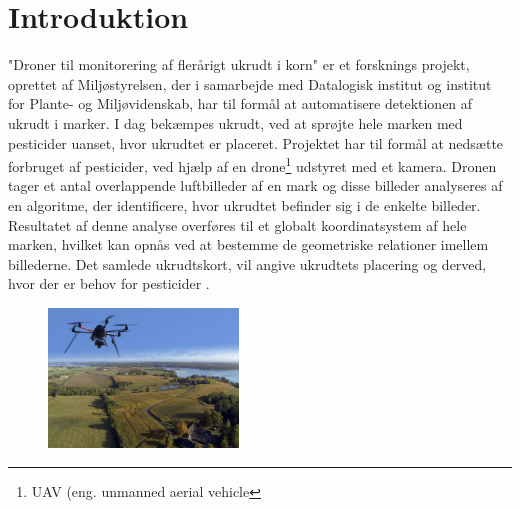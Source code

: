 \chapter{Introduktion} \label{sec:intro}
"Droner til monitorering af flerårigt ukrudt i korn" er et forsknings projekt, oprettet af Miljøstyrelsen, der i samarbejde med Datalogisk institut og institut for Plante- og Miljøvidenskab, har til formål at automatisere detektionen af ukrudt i marker. I dag bekæmpes ukrudt, ved at sprøjte hele marken med pesticider uanset, hvor ukrudtet er placeret. Projektet har til formål at nedsætte forbruget af pesticider, ved hjælp af en drone\footnote{UAV (eng. unmanned aerial vehicle} udstyret med et kamera. Dronen tager et antal overlappende luftbilleder af en mark og disse billeder analyseres af en algoritme, der identificere, hvor ukrudtet befinder sig i de enkelte billeder. Resultatet af denne analyse overføres til et globalt koordinatsystem af hele marken, hvilket kan opnås ved at bestemme de geometriske relationer imellem billederne. Det samlede ukrudtskort, vil angive ukrudtets placering og derved, hvor der er behov for pesticider \cite{drone}.
\begin{figure}[H]
    \centering
    \includegraphics[width=0.45\textwidth]{fig/drone4.jpg}
     \vspace{-0.5em}
    \begin{center}    
       \caption{\textcolor{gray}{\footnotesize \textit{ }}}
    \label{fig:difference}
     \end{center}
     \vspace{-3em}
  \end{figure} \noindent

